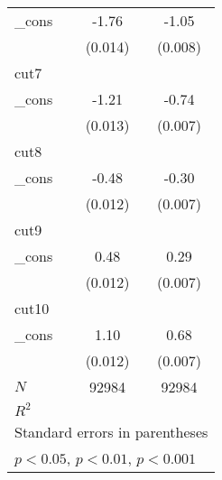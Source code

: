 {\begin{tabular}{l*{2}{c}}
\_cons      &       -1.76\sym{***}&       -1.05\sym{***}\\
            &     (0.014)         &     (0.008)         \\
\hline
cut7        &                     &                     \\
\_cons      &       -1.21\sym{***}&       -0.74\sym{***}\\
            &     (0.013)         &     (0.007)         \\
\hline
cut8        &                     &                     \\
\_cons      &       -0.48\sym{***}&       -0.30\sym{***}\\
            &     (0.012)         &     (0.007)         \\
\hline
cut9        &                     &                     \\
\_cons      &        0.48\sym{***}&        0.29\sym{***}\\
            &     (0.012)         &     (0.007)         \\
\hline
cut10       &                     &                     \\
\_cons      &        1.10\sym{***}&        0.68\sym{***}\\
            &     (0.012)         &     (0.007)         \\
\hline
\(N\)       &       92984         &       92984         \\
\(R^{2}\)   &                     &                     \\
\hline\hline
\multicolumn{3}{l}{\footnotesize Standard errors in parentheses}\\
\multicolumn{3}{l}{\footnotesize \sym{*} \(p<0.05\), \sym{**} \(p<0.01\), \sym{***} \(p<0.001\)}\\
\end{tabular}
}
